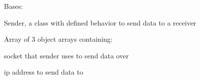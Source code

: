 \documentclass[letterpaper,10pt,oneside,english,openany]{sphinxmanual}
\begin{document}
\begin{fulllineitems}
\label{\detokenize{modules:sender_rdt.Sender}}
\pysigstartsignatures
\pysiglinewithargsret
{}
{\sphinxparamcomma {}\sphinxparamcomma {}\sphinxparamcomma {}}
{}
\pysigstopsignatures
\sphinxAtStartPar
Bases: 

\sphinxAtStartPar
Sender, a class with defined behavior to send data to a receiver

\begin{fulllineitems}
\label{\detokenize{modules:sender_rdt.Sender.packets}}
\pysigstartsignatures
\pysigline
{}
\pysigstopsignatures
\sphinxAtStartPar
Array of 3 object arrays containing:

\end{fulllineitems}



\begin{fulllineitems}

\pysigstartsignatures
\pysigline
{}
\pysigstopsignatures
\end{fulllineitems}


\begin{fulllineitems}
\label{\detokenize{modules:sender_rdt.Sender.soc}}
\pysigstartsignatures
\pysigline
{}
\pysigstopsignatures
\sphinxAtStartPar
socket that sender uses to send data over

\end{fulllineitems}


\begin{fulllineitems}
\label{\detokenize{modules:sender_rdt.Sender.ip}}
\pysigstartsignatures
\pysigline
{}
\pysigstopsignatures
\sphinxAtStartPar
ip address to send data to


\end{fulllineitems}
\end{fulllineitems}
\end{document}
